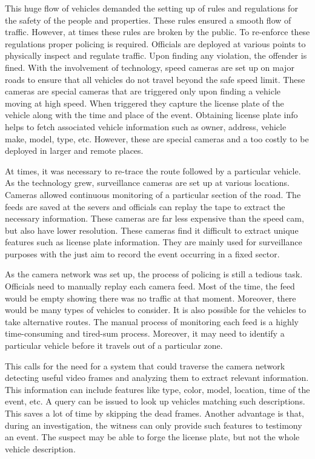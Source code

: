 This huge flow of vehicles demanded the setting up of rules and regulations for the safety of the people and properties. These rules ensured a smooth flow of traffic. However, at times these rules are broken by the public. To re-enforce these regulations proper policing is required. Officials are deployed at various points to physically inspect and regulate traffic. Upon finding any violation, the offender is fined. With the involvement of technology, speed cameras are set up on major roads to ensure that all vehicles do not travel beyond the safe speed limit. These cameras are special cameras that are triggered only upon finding a vehicle moving at high speed. When triggered they capture the license plate of the vehicle along with the time and place of the event. Obtaining license plate info helps to fetch associated vehicle information such as owner, address, vehicle make, model, type, etc. However, these are special cameras and a too costly to be deployed in larger and remote places.

At times, it was necessary to re-trace the route followed by a particular vehicle. As the technology grew, surveillance cameras are set up at various locations. Cameras allowed continuous monitoring of a particular section of the road. The feeds are saved at the severs and officials can replay the tape to extract the necessary information. These cameras are far less expensive than the speed cam, but also have lower resolution. These cameras find it difficult to extract unique features such as license plate information. They are mainly used for surveillance purposes with the just aim to record the event occurring in a fixed sector.  

As the camera network was set up, the process of policing is still a tedious task. Officials need to manually replay each camera feed. Most of the time, the feed would be empty showing there was no traffic at that moment. Moreover, there would be many types of vehicles to consider. It is also possible for the vehicles to take alternative routes. The manual process of monitoring each feed is a highly time-consuming and tired-sum process. Moreover, it may need to identify a particular vehicle before it travels out of a particular zone.

This calls for the need for a system that could traverse the camera network detecting useful video frames and analyzing them to extract relevant information. This information can include features like type, color, model, location, time of the event, etc. A query can be issued to look up vehicles matching such descriptions. This saves a lot of time by skipping the dead frames. Another advantage is that, during an investigation, the witness can only provide such features to testimony an event. The suspect may be able to forge the license plate, but not the whole vehicle description. 



